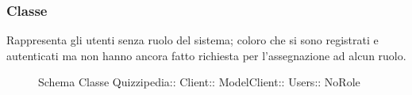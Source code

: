 \subsubsection{Classe }
Rappresenta gli utenti senza ruolo del sistema; coloro che si sono registrati e autenticati ma non hanno ancora fatto richiesta per l'assegnazione ad alcun ruolo.
\begin{figure}[H]
\centering
\noindent{}
\caption[Schema Classe NoRole]{Schema Classe Quizzipedia:: Client:: ModelClient:: Users:: NoRole}
\end{figure}
